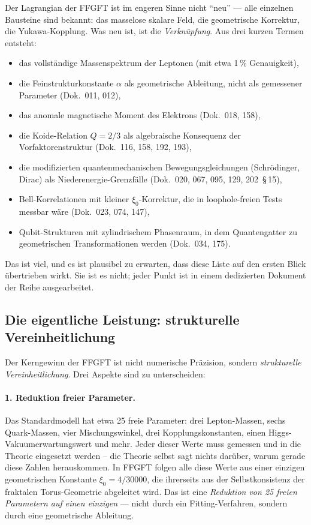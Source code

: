 Der Lagrangian der FFGFT ist im engeren Sinne nicht
\enquote{neu} --- alle einzelnen Bausteine sind bekannt: das masselose
skalare Feld, die geometrische Korrektur, die Yukawa-Kopplung. Was
neu ist, ist die \emph{Verknüpfung}. Aus drei kurzen Termen entsteht:
\begin{itemize}
  \item das vollständige Massenspektrum der Leptonen (mit etwa 1\,\%
        Genauigkeit),
  \item die Feinstrukturkonstante $\alpha$ als geometrische
        Ableitung, nicht als gemessener Parameter (Dok.~011, 012),
  \item das anomale magnetische Moment des Elektrons (Dok.~018, 158),
  \item die Koide-Relation $Q = 2/3$ als algebraische Konsequenz der
        Vorfaktorenstruktur (Dok.~116, 158, 192, 193),
  \item die modifizierten quantenmechanischen Bewegungsgleichungen
        (Schrödinger, Dirac) als Niederenergie-Grenzfälle
        (Dok.~020, 067, 095, 129, 202~\S\,15),
  \item Bell-Korrelationen mit kleiner $\xi_0$-Korrektur, die in
        loophole-freien Tests messbar wäre (Dok.~023, 074, 147),
  \item Qubit-Strukturen mit zylindrischem Phasenraum, in dem
        Quantengatter zu geometrischen Transformationen werden
        (Dok.~034, 175).
\end{itemize}

Das ist viel, und es ist plausibel zu erwarten, dass diese Liste
auf den ersten Blick übertrieben wirkt. Sie ist es nicht; jeder
Punkt ist in einem dedizierten Dokument der Reihe ausgearbeitet.

\subsection*{Die eigentliche Leistung: strukturelle Vereinheitlichung}

Der Kerngewinn der FFGFT ist nicht numerische Präzision, sondern
\emph{strukturelle Vereinheitlichung}. Drei Aspekte sind zu
unterscheiden:

\paragraph{1. Reduktion freier Parameter.}
Das Standardmodell hat etwa 25 freie Parameter: drei Lepton-Massen,
sechs Quark-Massen, vier Mischungswinkel, drei Kopplungskonstanten,
einen Higgs-Vakuumerwartungswert und mehr. Jeder dieser Werte muss
gemessen und in die Theorie eingesetzt werden -- die Theorie selbst
sagt nichts darüber, warum gerade diese Zahlen herauskommen. In
FFGFT folgen alle diese Werte aus einer einzigen geometrischen
Konstante $\xi_0 = 4/30000$, die ihrerseits aus der Selbstkonsistenz
der fraktalen Torus-Geometrie abgeleitet wird. Das ist eine
\emph{Reduktion von 25 freien Parametern auf einen einzigen} ---
nicht durch ein Fitting-Verfahren, sondern durch eine geometrische
Ableitung.

